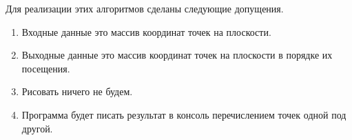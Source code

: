 \documentclass{article}
\begin{document}
Для реализации этих алгоритмов сделаны следующие допущения.

\begin{enumerate}
    \item Входные данные это массив координат точек на плоскости.
    \item Выходные данные это массив координат точек на плоскости в порядке их посещения.
    \item Рисовать ничего не будем.
    \item Программа будет писать результат в консоль перечислением точек одной под другой.
\end{enumerate}
\end{document}

